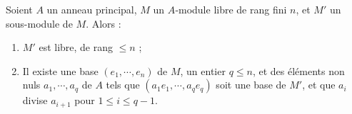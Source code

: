 \documentclass[11pt, %
  title in boldface,
  theorem in new line,
  theorem numbering = section,
  number theorems separately,
  simple name,
]{beaulivre}
\begin{document}
    \begin{theorem}\label{thm:base adaptée}
        Soient \( A \) un anneau principal, \( M \) un \( A \)‑module libre de rang fini \( n \), et \( M' \) un sous-module de \( M \). Alors :
        \begin{enumerate}
            \item \label{thm:base adaptée;item1} \( M' \) est libre, de rang \( \leqslant n \) ;
            \item \label{thm:base adaptée;item2} Il existe une base \( (e_1, \cdots, e_n) \) de \( M \), un entier \( q \leqslant n \), et des éléments non nuls \( a_1, \cdots, a_q \) de \( A \) tels que \( (a_1 e_1, \cdots, a_q e_q) \) soit une base de \( M' \), et que \( a_i \) divise \( a_{i+1} \) pour \( 1 \leqslant i \leqslant q-1 \).
        \end{enumerate}
    \end{theorem}
\end{document}
